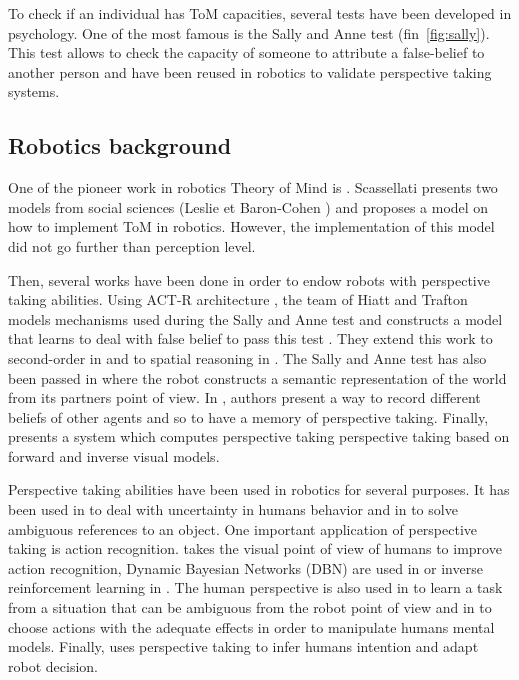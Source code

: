 \documentclass[english,a4paper,11pt,twoside]{StyleThese}
\begin{document}
To check if an individual has ToM capacities, several tests have been developed in psychology. One of the most famous is the Sally and Anne test (fin~\ref{fig:sally}). This test allows to check the capacity of someone to attribute a false-belief to another person and have been reused in robotics to validate perspective taking systems.

\subsection{Robotics background}

One of the pioneer work in robotics Theory of Mind is \cite{scassellati2002theory}. Scassellati presents two models from social sciences (Leslie \cite{leslie1984spatiotemporal} et Baron-Cohen \cite{baron1997mindblindness}) and proposes a model on how to implement ToM in robotics. However, the implementation of this model did not go further than perception level.

Then, several works have been done in order to endow robots with perspective taking abilities. Using ACT-R architecture \cite{anderson2004integrated}, the team of Hiatt and Trafton models mechanisms used during the Sally and Anne test and constructs a model that learns to deal with false belief to pass this test \cite{hiatt2010cognitive}. They extend this work to second-order in \cite{hiatt2015understanding} and to spatial reasoning in \cite{hiatt2004cognitive}. The Sally and Anne test has also been passed in \cite{milliez2014framework} where the robot constructs a semantic representation of the world from its partners point of view. In \cite{berlin2006perspective}, authors present a way to record different beliefs of other agents and so to have a memory of perspective taking. Finally, \cite{johnson2005perspective} presents a system which computes perspective taking perspective taking based on forward and inverse visual models.

Perspective taking abilities have been used in robotics for several purposes. It has been used in \cite{hiatt2011accommodating} to deal with uncertainty in humans behavior and in \cite{ros2010solving} to solve ambiguous references to an object. One important application of perspective taking is action recognition. \cite{johnson2005perceptual} takes the visual point of view of humans to improve action recognition, Dynamic Bayesian Networks (DBN) are used in \cite{baker2014modeling} or inverse reinforcement learning  in \cite{nagai2015probabilistic}. The human perspective is also used in \cite{breazeal2006using} to learn a task from a situation that can be ambiguous from the robot point of view and in \cite{gray2014manipulating} to choose actions with the adequate effects in order to manipulate humans mental models. Finally, \cite{gorur2017toward} uses perspective taking to infer humans intention and adapt robot decision.
\end{document}
